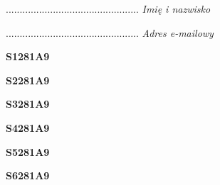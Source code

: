 \begin{turn}{90}\begin{minipage}{\linewidth} \vspace{20mm} ................................................  \textit{Imię i nazwisko}\end{minipage}\end{turn}

\begin{turn}{90}\begin{minipage}{\linewidth} \vspace{20mm} ................................................  \textit{Adres e-mailowy}\end{minipage}\end{turn}

\begin{turn}{90}\huge \begin{minipage}{\linewidth} \vspace{10mm}\textbf{S1281A9}\end{minipage}\end{turn}

\begin{turn}{90}\huge \begin{minipage}{\linewidth} \vspace{10mm}\textbf{S2281A9}\end{minipage}\end{turn}

\begin{turn}{90}\huge \begin{minipage}{\linewidth} \vspace{10mm}\textbf{S3281A9}\end{minipage}\end{turn}

\begin{turn}{90}\huge \begin{minipage}{\linewidth} \vspace{10mm}\textbf{S4281A9}\end{minipage}\end{turn}

\begin{turn}{90}\huge \begin{minipage}{\linewidth} \vspace{10mm}\textbf{S5281A9}\end{minipage}\end{turn}

\begin{turn}{90}\huge \begin{minipage}{\linewidth} \vspace{10mm}\textbf{S6281A9}\end{minipage}\end{turn}

